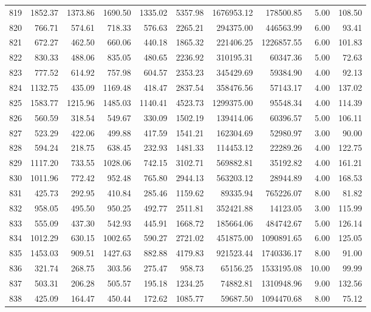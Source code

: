 \begin{tabular}{lrrrrrrrrr}
819 & 1852.37 & 1373.86 & 1690.50 & 1335.02 & 5357.98 & 1676953.12 & 178500.85 & 5.00 & 108.50 \\
820 & 766.71 & 574.61 & 718.33 & 576.63 & 2265.21 & 294375.00 & 446563.99 & 6.00 & 93.41 \\
821 & 672.27 & 462.50 & 660.06 & 440.18 & 1865.32 & 221406.25 & 1226857.55 & 6.00 & 101.83 \\
822 & 830.33 & 488.06 & 835.05 & 480.65 & 2236.92 & 310195.31 & 60347.36 & 5.00 & 72.63 \\
823 & 777.52 & 614.92 & 757.98 & 604.57 & 2353.23 & 345429.69 & 59384.90 & 4.00 & 92.13 \\
824 & 1132.75 & 435.09 & 1169.48 & 418.47 & 2837.54 & 358476.56 & 57143.17 & 4.00 & 137.02 \\
825 & 1583.77 & 1215.96 & 1485.03 & 1140.41 & 4523.73 & 1299375.00 & 95548.34 & 4.00 & 114.39 \\
826 & 560.59 & 318.54 & 549.67 & 330.09 & 1502.19 & 139414.06 & 60396.57 & 5.00 & 106.11 \\
827 & 523.29 & 422.06 & 499.88 & 417.59 & 1541.21 & 162304.69 & 52980.97 & 3.00 & 90.00 \\
828 & 594.24 & 218.75 & 638.45 & 232.93 & 1481.33 & 114453.12 & 22289.26 & 4.00 & 122.75 \\
829 & 1117.20 & 733.55 & 1028.06 & 742.15 & 3102.71 & 569882.81 & 35192.82 & 4.00 & 161.21 \\
830 & 1011.96 & 772.42 & 952.48 & 765.80 & 2944.13 & 563203.12 & 28944.89 & 4.00 & 168.53 \\
831 & 425.73 & 292.95 & 410.84 & 285.46 & 1159.62 & 89335.94 & 765226.07 & 8.00 & 81.82 \\
832 & 958.05 & 495.50 & 950.25 & 492.77 & 2511.81 & 352421.88 & 14123.05 & 3.00 & 115.99 \\
833 & 555.09 & 437.30 & 542.93 & 445.91 & 1668.72 & 185664.06 & 484742.67 & 5.00 & 126.14 \\
834 & 1012.29 & 630.15 & 1002.65 & 590.27 & 2721.02 & 451875.00 & 1090891.65 & 6.00 & 125.05 \\
835 & 1453.03 & 909.51 & 1427.63 & 882.88 & 4179.83 & 921523.44 & 1740336.17 & 8.00 & 91.00 \\
836 & 321.74 & 268.75 & 303.56 & 275.47 & 958.73 & 65156.25 & 1533195.08 & 10.00 & 99.99 \\
837 & 503.31 & 206.28 & 505.57 & 195.18 & 1234.25 & 74882.81 & 1310948.96 & 9.00 & 132.56 \\
838 & 425.09 & 164.47 & 450.44 & 172.62 & 1085.77 & 59687.50 & 1094470.68 & 8.00 & 75.12 \\

\end{tabular}
